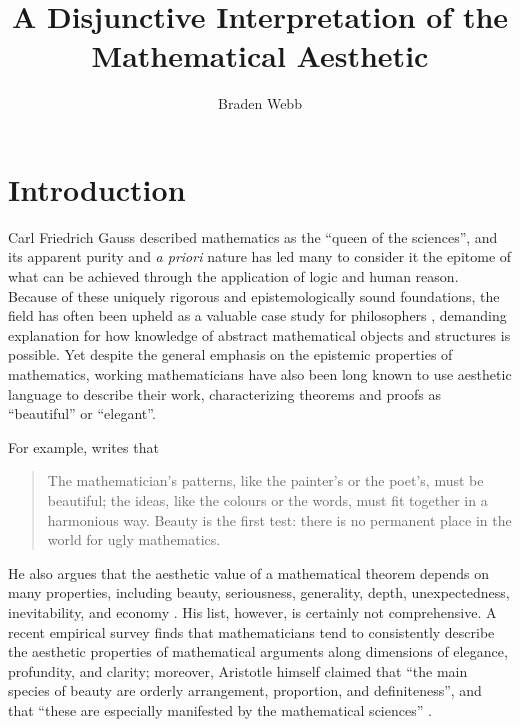 \documentclass[a4paper,man,natbib]{apa6}
\title{A Disjunctive Interpretation of the Mathematical Aesthetic}
\author{Braden Webb}
\affiliation{Department of Philosophy, Brigham Young University\\
PHIL 495R: Directed Readings in the Philosophy of Mathematics\\
Dr. Derek Haderlie\\
22 April 2023}
\begin{document}
\maketitle

\section{Introduction}
Carl Friedrich Gauss described mathematics as the ``queen of the sciences'', and its apparent purity and 
\textit{a priori} nature has led many to consider it the epitome of what can be achieved through
the application of logic and human reason. Because of these uniquely rigorous and epistemologically sound
foundations, the field has often been upheld as a valuable case study for philosophers \citep{shapiro_thinking_2000},
demanding explanation for how knowledge of abstract mathematical objects and structures is possible. 
Yet despite the general emphasis on the epistemic properties of mathematics, working mathematicians have 
also been long known to use aesthetic language to describe their work, characterizing theorems and proofs as
``beautiful'' or ``elegant''. 

For example, \cite{hardy_mathematicians_1940} writes that
\begin{quotation}
      The mathematician’s patterns, like the painter’s or the poet’s, must be beautiful; the ideas, like the 
      colours or the words, must fit together in a harmonious way. Beauty is the first test: there is no 
      permanent place in the world for ugly mathematics.
\end{quotation}
He also argues that the aesthetic value of a mathematical theorem depends on many properties, including
beauty, seriousness, generality, depth, unexpectedness, inevitability, and 
economy \citep{hardy_mathematicians_1940}. His list, however, is certainly not comprehensive. A recent empirical survey
\citep{johnson_intuitions_2019} finds that mathematicians tend to consistently describe the aesthetic properties of 
mathematical arguments along dimensions of elegance, profundity, and clarity; moreover, Aristotle himself 
claimed that ``the main species of beauty are orderly arrangement, proportion, and definiteness'', 
and that ``these are especially manifested by the mathematical sciences''
\cite[VIII, 1078a]{aristotle_metaphysics_nodate}.
\end{document}
